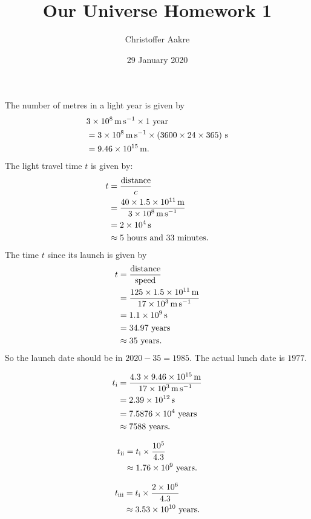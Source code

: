 \documentclass{templates/homework}
\title{Our Universe Homework 1}
\author{Christoffer Aakre}
\date{29 January 2020}
\begin{document}
\maketitle

\exercise 
\exercisepart
The number of metres in a light year is given by
\begin{align*}
    &\SI{3E8}{\meter\per\second} \times 1 \text{ year} \\
    &= \SI{3E8}{\meter\per\second} \times (3600 \times 24 \times 365) \text{ s} \\
    &= \SI{9.46E15}{\meter}.
\end{align*}
\exercisepart
The light travel time $t$ is given by:
\begin{align*}
    t &= \frac{\text{distance}}{c} \\
    &= \frac{40 \times \SI{1.5E11}{\meter}}{\SI{3E8}{\meter\per\second}} \\
    &= \SI{2E4}{\second} \\
    &\approx \text{5 hours and 33 minutes}.
\end{align*}
\exercisepart
The time $t$ since its launch is given by
\begin{align*}
    t &= \frac{\text{distance}}{\text{speed}} \\
    &= \frac{125 \times \SI{1.5E11}{\meter}}{\SI{17E3}{\meter\per\second}} \\
    &= \SI{1.1E9}{\second} \\
    &= \text{34.97 years} \\
    &\approx \text{35 years}.
\end{align*}
So the launch date should be in $2020 - 35 = 1985$. The actual
lunch date is $1977$.
\begin{subexercises}
    \item \begin{align*}
        t_\text{i} &= \frac{4.3 \times \SI{9.46E15}{\meter}}{\SI{17E3}{\meter\per\second}} \\
        &= \SI{2.39E12}{\second} \\
        &= \SI{7.5876E4}{} \text{ years} \\
        &\approx \text{7588 years}. \\
        \end{align*}
    \item 
    \begin{align*}
        t_\text{ii} &= t_\text{i} \times \frac{10^5}{4.3} \\
        &\approx \SI{1.76E9}{} \text{ years}.
    \end{align*}
    \item
    \begin{align*}
        t_\text{iii} &= t_\text{i} \times \frac{2 \times 10^6}{4.3} \\
        &\approx \SI{3.53E10}{} \text{ years}.
    \end{align*}
\end{subexercises}
\end{document}
